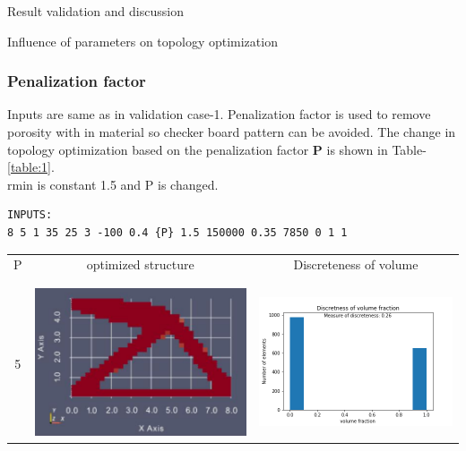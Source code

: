 \documentclass[a4paper,12pt,times]{article}
\begin{document}
\begin{section}{Result validation and discussion}
\begin{subsection}{Influence of parameters on topology optimization}
\subsubsection{Penalization factor}
Inputs are same as in validation case-1. Penalization factor is used to remove porosity with in material so checker board pattern can be avoided. 
The change in topology optimization based on the penalization factor \textbf{P} is shown in Table-\ref{table:1}. \\
rmin is constant 1.5 and {P} is changed.
\begin{lstlisting}
INPUTS:
8 5 1 35 25 3 -100 0.4 {P} 1.5 150000 0.35 7850 0 1 1
\end{lstlisting}

\begin{center} 
\begin{table} [H]
\begin{tabular}{c|c|c} 
P & optimized structure& Discreteness of volume\\ 
\\\hline\\
5&\includegraphics[scale = 0.5]{penal_5.png} & \includegraphics[scale = 0.4]{MMA_discretness_penal_5.png}\\ 

\end{tabular}
\end{table}
\end{center}
\end{subsection}
\end{section}
\end{document}
